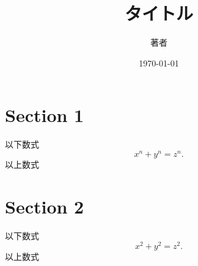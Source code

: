 \documentclass[titlepage]{jarticle}
\title{タイトル}
\author{著者}
\date{\today}
\begin{document}

\maketitle


\tableofcontents

\newpage

\section{Section 1}
以下数式
\[x^n + y^n = z^n.\]
以上数式

\newpage
\section{Section 2}
以下数式
\[x^2 + y^2 = z^2.\]
以上数式
\end{document}
